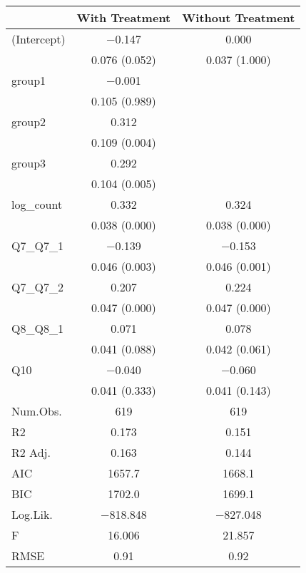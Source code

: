 \begin{table}
\centering
\begin{tabular}[t]{lcc}
\toprule
  & With Treatment & Without Treatment\\
\midrule
(Intercept) & \num{-0.147} & \num{0.000}\\
 & \num{0.076} (\num{0.052}) & \num{0.037} (\num{1.000})\\
group1 & \num{-0.001} & \\
 & \num{0.105} (\num{0.989}) & \\
group2 & \num{0.312} & \\
 & \num{0.109} (\num{0.004}) & \\
group3 & \num{0.292} & \\
 & \num{0.104} (\num{0.005}) & \\
log\_count & \num{0.332} & \num{0.324}\\
 & \num{0.038} (\num{0.000}) & \num{0.038} (\num{0.000})\\
Q7\_Q7\_1 & \num{-0.139} & \num{-0.153}\\
 & \num{0.046} (\num{0.003}) & \num{0.046} (\num{0.001})\\
Q7\_Q7\_2 & \num{0.207} & \num{0.224}\\
 & \num{0.047} (\num{0.000}) & \num{0.047} (\num{0.000})\\
Q8\_Q8\_1 & \num{0.071} & \num{0.078}\\
 & \num{0.041} (\num{0.088}) & \num{0.042} (\num{0.061})\\
Q10 & \num{-0.040} & \num{-0.060}\\
 & \num{0.041} (\num{0.333}) & \num{0.041} (\num{0.143})\\
\midrule
Num.Obs. & \num{619} & \num{619}\\
R2 & \num{0.173} & \num{0.151}\\
R2 Adj. & \num{0.163} & \num{0.144}\\
AIC & \num{1657.7} & \num{1668.1}\\
BIC & \num{1702.0} & \num{1699.1}\\
Log.Lik. & \num{-818.848} & \num{-827.048}\\
F & \num{16.006} & \num{21.857}\\
RMSE & \num{0.91} & \num{0.92}\\
\bottomrule
\end{tabular}
\end{table}
